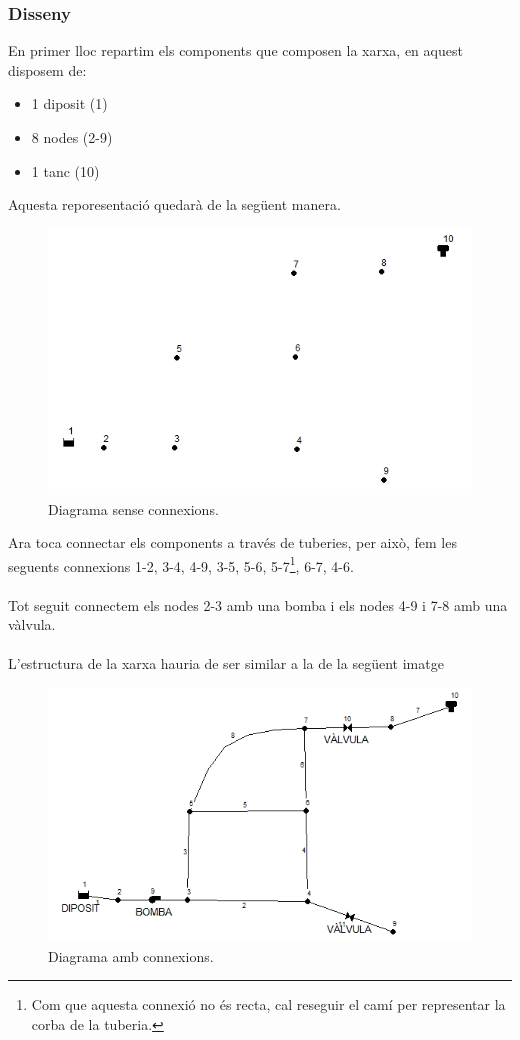 \documentclass[12pt]{article}
\begin{document}
\subsubsection{Disseny}
En primer lloc repartim els components que composen la xarxa, en aquest disposem de:
\begin{itemize}
	\item 1 diposit (1)
	\item 8 nodes (2-9)
	\item 1 tanc (10)
\end{itemize}
Aquesta reporesentació quedarà de la següent manera.
\begin{figure}[h!]
	\centering
	\includegraphics[scale=.7]{imatges/epanet/5.png}
	\caption{Diagrama sense connexions.}
\end{figure}
Ara toca connectar els components a través de tuberies, per això, fem les seguents connexions 1-2, 3-4, 4-9, 3-5, 5-6, 5-7\footnote{Com que aquesta connexió no és recta, cal reseguir el camí per representar la corba de la tuberia.}, 6-7, 4-6. 
\\\\Tot seguit connectem els nodes 2-3 amb una bomba i els nodes 4-9 i 7-8 amb una vàlvula.
\\\\L'estructura de la xarxa hauria de ser similar a la de la següent imatge
\begin{figure}[h!]
	\centering
	\includegraphics[scale=.7]{imatges/epanet/6.png}
	\caption{Diagrama amb connexions.}
\end{figure}
\end{document}
